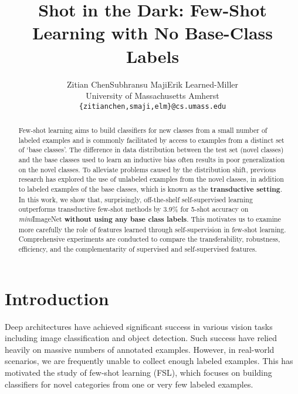 \documentclass[final]{cvpr}
\newcommand{\secvspace}{\vspace{-0.0em}}
\begin{document}
\title{Shot in the Dark: Few-Shot Learning with No Base-Class Labels}

\author{Zitian Chen\qquad Subhransu Maji\qquad Erik Learned-Miller\\
University of Massachusetts Amherst\\  {\tt\small \{zitianchen,smaji,elm\}@cs.umass.edu}}

\maketitle

\pagestyle{empty}  \thispagestyle{empty} \begin{abstract}

Few-shot learning aims to build classifiers for new classes from a small number of labeled examples and is commonly facilitated by access to examples from a distinct set of ‘base classes’. The difference in data distribution between the test set (novel classes) and the base classes used to learn an inductive bias often results in poor generalization on the novel classes. To alleviate problems caused by the distribution shift, previous research has explored the use of unlabeled examples from the novel classes, in addition to labeled examples of the base classes, which is known as the \textbf{transductive setting}. In this work, we show that, surprisingly, off-the-shelf self-supervised learning outperforms transductive few-shot methods by 3.9\% for 5-shot accuracy on \emph{mini}ImageNet \textbf{without using any base class labels}. This motivates us to examine more carefully the role of features learned through self-supervision in few-shot learning. Comprehensive experiments are conducted to compare the transferability, robustness, efficiency, and the complementarity of supervised and self-supervised features.
  
\end{abstract}



\secvspace
\section{Introduction}
\secvspace

Deep architectures have achieved significant success in various vision tasks including image classification and object detection. Such success have relied heavily on massive numbers of annotated examples. However, in real-world scenarios, we are frequently unable to collect enough labeled examples. This has motivated the study of few-shot learning (FSL), which focuses on building classifiers for novel categories from one or very few labeled examples. 
\end{document}
